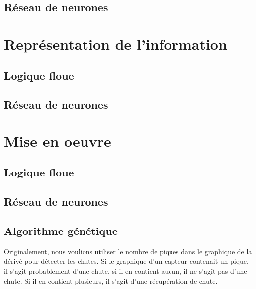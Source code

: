 \documentclass[12pt,letterpaper]{article}
\begin{document}
\subsection{Réseau de neurones} %

\section{Représentation de l'information}

\subsection{Logique floue}

\subsection{Réseau de neurones} %

\section{Mise en oeuvre}

\subsection{Logique floue}

\subsection{Réseau de neurones} %

\subsection{Algorithme génétique}

Originalement, nous voulions utiliser le nombre de piques dans le graphique de la dérivé pour détecter les chutes.
Si le graphique d'un capteur contenait un pique, il s'agit probablement d'une chute, si il en contient aucun, il 
ne s'agît pas d'une chute. Si il en contient plusieurs, il s'agit d'une récupération de chute. 
\end{document}
